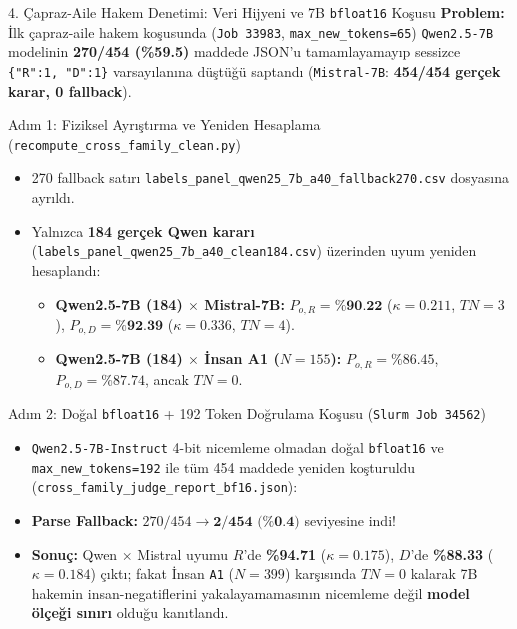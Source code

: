 \documentclass[aspectratio=169,10pt]{beamer}
\begin{document}
\begin{frame}{4. Çapraz-Aile Hakem Denetimi: Veri Hijyeni ve 7B \texttt{bfloat16} Koşusu}
\scriptsize
\textbf{Problem:} İlk çapraz-aile hakem koşusunda (\texttt{Job 33983}, \texttt{max\_new\_tokens=65}) \texttt{Qwen2.5-7B} modelinin \textbf{270/454 (\%59.5)} maddede JSON'u tamamlayamayıp sessizce \texttt{\{"R":1, "D":1\}} varsayılanına düştüğü saptandı (\texttt{Mistral-7B}: \textbf{454/454 gerçek karar, 0 fallback}).

\begin{block}{Adım 1: Fiziksel Ayrıştırma ve Yeniden Hesaplama (\texttt{recompute\_cross\_family\_clean.py})}
\begin{itemize}
    \item 270 fallback satırı \texttt{labels\_panel\_qwen25\_7b\_a40\_fallback270.csv} dosyasına ayrıldı.
    \item Yalnızca \textbf{184 gerçek Qwen kararı} (\texttt{labels\_panel\_qwen25\_7b\_a40\_clean184.csv}) üzerinden uyum yeniden hesaplandı:
    \begin{itemize}
        \item \textbf{Qwen2.5-7B (184) $\times$ Mistral-7B:} $P_{o,R} = \textbf{\%90.22}$ ($\kappa=0.211$, $TN=3$), $P_{o,D} = \textbf{\%92.39}$ ($\kappa=0.336$, $TN=4$).
        \item \textbf{Qwen2.5-7B (184) $\times$ İnsan A1 ($N=155$):} $P_{o,R} = \%86.45$, $P_{o,D} = \%87.74$, ancak \textbf{$TN = 0$}.
    \end{itemize}
\end{itemize}
\end{block}

\begin{block}{Adım 2: Doğal \texttt{bfloat16} + 192 Token Doğrulama Koşusu (\texttt{Slurm Job 34562})}
\begin{itemize}
    \item \texttt{Qwen2.5-7B-Instruct} 4-bit nicemleme olmadan doğal \texttt{bfloat16} ve \texttt{max\_new\_tokens=192} ile tüm 454 maddede yeniden koşturuldu (\texttt{cross\_family\_judge\_report\_bf16.json}):
    \item \textbf{Parse Fallback:} $270/454 \longrightarrow \textbf{2/454 (\%0.4)}$ seviyesine indi!
    \item \textbf{Sonuç:} Qwen $\times$ Mistral uyumu $R$'de \textbf{\%94.71} ($\kappa=0.175$), $D$'de \textbf{\%88.33} ($\kappa=0.184$) çıktı; fakat İnsan \texttt{A1} ($N=399$) karşısında \textbf{$TN = 0$} kalarak 7B hakemin insan-negatiflerini yakalayamamasının nicemleme değil \textbf{model ölçeği sınırı} olduğu kanıtlandı.
\end{itemize}
\end{block}
\end{frame}
\end{document}
